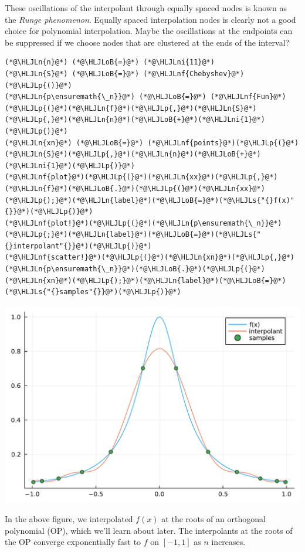 \documentclass[12pt,a4paper]{article}
\newcommand{\HLJLn}[1]{#1}
\newcommand{\HLJLnf}[1]{\textcolor[RGB]{66,102,213}{#1}}
\newcommand{\HLJLs}[1]{\textcolor[RGB]{201,61,57}{#1}}
\newcommand{\HLJLni}[1]{\textcolor[RGB]{59,151,46}{#1}}
\newcommand{\HLJLoB}[1]{\textcolor[RGB]{102,102,102}{\textbf{#1}}}
\newcommand{\HLJLp}[1]{#1}
\begin{document}
These oscillations of the interpolant through equally spaced nodes is known as the \emph{Runge phenomenon}. Equally spaced interpolation nodes is clearly not a good choice for polynomial interpolation.  Maybe the oscillations at the endpoints can be suppressed if we choose nodes that are clustered at the ends of the interval?


\begin{lstlisting}
(*@\HLJLn{n}@*) (*@\HLJLoB{=}@*) (*@\HLJLni{11}@*)
(*@\HLJLn{S}@*) (*@\HLJLoB{=}@*) (*@\HLJLnf{Chebyshev}@*)(*@\HLJLp{()}@*)
(*@\HLJLn{p\ensuremath{\_n}}@*) (*@\HLJLoB{=}@*) (*@\HLJLnf{Fun}@*)(*@\HLJLp{(}@*)(*@\HLJLn{f}@*)(*@\HLJLp{,}@*)(*@\HLJLn{S}@*)(*@\HLJLp{,}@*)(*@\HLJLn{n}@*)(*@\HLJLoB{+}@*)(*@\HLJLni{1}@*)(*@\HLJLp{)}@*) 
(*@\HLJLn{xn}@*) (*@\HLJLoB{=}@*) (*@\HLJLnf{points}@*)(*@\HLJLp{(}@*)(*@\HLJLn{S}@*)(*@\HLJLp{,}@*)(*@\HLJLn{n}@*)(*@\HLJLoB{+}@*)(*@\HLJLni{1}@*)(*@\HLJLp{)}@*) 
(*@\HLJLnf{plot}@*)(*@\HLJLp{(}@*)(*@\HLJLn{xx}@*)(*@\HLJLp{,}@*)(*@\HLJLn{f}@*)(*@\HLJLoB{.}@*)(*@\HLJLp{(}@*)(*@\HLJLn{xx}@*)(*@\HLJLp{);}@*)(*@\HLJLn{label}@*)(*@\HLJLoB{=}@*)(*@\HLJLs{"{}f(x)"{}}@*)(*@\HLJLp{)}@*)
(*@\HLJLnf{plot!}@*)(*@\HLJLp{(}@*)(*@\HLJLn{p\ensuremath{\_n}}@*)(*@\HLJLp{;}@*)(*@\HLJLn{label}@*)(*@\HLJLoB{=}@*)(*@\HLJLs{"{}interpolant"{}}@*)(*@\HLJLp{)}@*)
(*@\HLJLnf{scatter!}@*)(*@\HLJLp{(}@*)(*@\HLJLn{xn}@*)(*@\HLJLp{,}@*)(*@\HLJLn{p\ensuremath{\_n}}@*)(*@\HLJLoB{.}@*)(*@\HLJLp{(}@*)(*@\HLJLn{xn}@*)(*@\HLJLp{);}@*)(*@\HLJLn{label}@*)(*@\HLJLoB{=}@*)(*@\HLJLs{"{}samples"{}}@*)(*@\HLJLp{)}@*)
\end{lstlisting}

\includegraphics[width=\linewidth]{jl_hpkPoK/OP_methods_test_5_1.pdf}

In the above figure, we interpolated $f(x)$ at the roots of an orthogonal polynomial (OP), which we'll learn about later.  The interpolants at the roots of the OP converge exponentially fast to $f$ on $[-1, 1]$ as $n$ increases.
\end{document}
